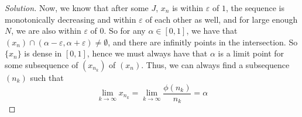 \documentclass{article}
\newcommand{\ep}{{\varepsilon}}
\begin{document}
\begin{proof}[Solution]
Now, we know that after some $J$, $x_n$ is within $\ep$ of $1$,
the sequence is monotonically decreasing and within $\ep$ of each other as well,
and for large enough $N$, we are also within $\ep$ of $0$.
So for any $\alpha \in [0,1]$, we have that $(x_n)\cap (\alpha - \ep, \alpha + \ep) \neq \emptyset$,
and there are infinitly points in the intersection.
So $\{x_n\}$ is dense in $[0,1]$, hence we must always have that
$\alpha$ is a limit point for some subsequence of $(x_{n_k})$ of $(x_n)$.
Thus, we can always find a subsequence $(n_k)$ such that
\[
	\lim_{k\to\infty}x_{n_k} = \lim_{k\to\infty}\frac{\phi(n_k)}{n_k} = \alpha
\]
\end{proof}
\end{document}
